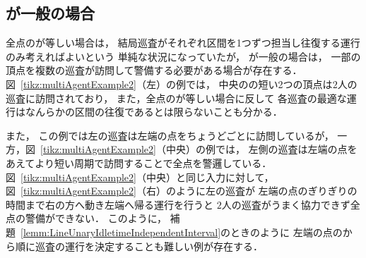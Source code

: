 \subsection{{\maxIdletime}が一般の場合}
\label{theo:LineArbitraryIdletime}

全点の{\maxIdletime}が等しい場合は，
結局巡査がそれぞれ区間を1つずつ担当し往復する運行のみ考えればよいという
単純な状況になっていたが，
{\maxIdletime}が一般の場合は，
一部の頂点を複数の巡査が訪問して警備する必要がある場合が存在する．
%
図~\ref{tikz:multiAgentExample2}（左）の例では，
中央の{\maxIdletime}の短い2つの頂点は$2$人の巡査に訪問されており，
また，全点の{\maxIdletime}が等しい場合に反して
各巡査の最適な運行はなんらかの区間の往復であるとは限らないことも分かる．


また，
この例では左の巡査は左端の点を{\maxIdletime}ちょうどごとに訪問しているが，
一方，図~\ref{tikz:multiAgentExample2}（中央）の例では，
左側の巡査は左端の点をあえてより短い周期で訪問することで全点を警邏している．
図~\ref{tikz:multiAgentExample2}（中央）と同じ入力に対して，
図~\ref{tikz:multiAgentExample2}（右）のように左の巡査が
左端の点の{\maxIdletime}ぎりぎりの時間まで右の方へ動き左端へ帰る運行を行うと
$2$人の巡査がうまく協力できず全点の警備ができない．
このように，
補題~\ref{lemm:LineUnaryIdletimeIndependentInterval}のときのように
左端の点の{\maxIdletime}から順に巡査の運行を決定することも難しい例が存在する．

